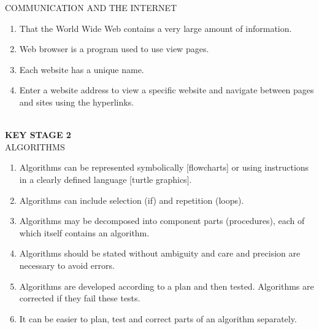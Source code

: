 COMMUNICATION AND THE INTERNET
\begin{enumerate}
\item That the World Wide Web contains a very large amount of information.
\item Web browser is a program used to use view pages.
\item Each website has a unique name.
\item Enter a website address to view a specific website and navigate between pages and
sites using the hyperlinks.
\end{enumerate} \\

\textbf{KEY STAGE 2}\\
ALGORITHMS
\begin{enumerate}
\item Algorithms can be represented symbolically [flowcharts] or using instructions in a
clearly defined language [turtle graphics].
\item Algorithms can include selection (if) and repetition (loops).
\item Algorithms may be decomposed into component parts (procedures), each of which
itself contains an algorithm.
\item Algorithms should be stated without ambiguity and care and precision are necessary
to avoid errors.
\item Algorithms are developed according to a plan and then tested. Algorithms are
corrected if they fail these tests.
\item It can be easier to plan, test and correct parts of an algorithm separately.
\end{enumerate}

